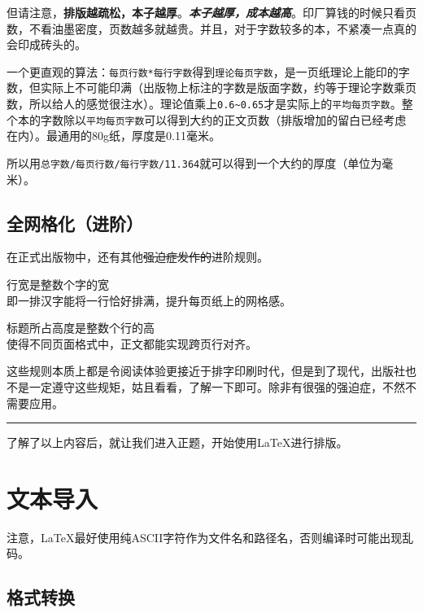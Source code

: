 \documentclass[10pt,openany]{book}
\begin{document}
但请注意，\textbf{排版越疏松，本子越厚}。\emph{\textbf{本子越厚，成本越高}}。印厂算钱的时候只看页数，不看油墨密度，页数越多就越贵。并且，对于字数较多的本，不紧凑一点真的会印成砖头的。

一个更直观的算法：\texttt{每页行数*每行字数}得到\texttt{理论每页字数}，是一页纸理论上能印的字数，但实际上不可能印满（出版物上标注的字数是版面字数，约等于理论字数乘页数，所以给人的感觉很注水）。理论值乘上\texttt{0.6\textasciitilde{}0.65}才是实际上的\texttt{平均每页字数}。整个本的字数除以\texttt{平均每页字数}可以得到大约的正文页数（排版增加的留白已经考虑在内）。最通用的80g纸，厚度是0.11毫米。

所以用\texttt{总字数/每页行数/每行字数/11.364}就可以得到一个大约的厚度（单位为毫米）。

\section{全网格化（进阶）}

在正式出版物中，还有其他\sout{强迫症发作的}进阶规则。

\begin{tightenum}
    \item   行宽是整数个字的宽\\即一排汉字能将一行恰好排满，提升每页纸上的网格感。
    \item   标题所占高度是整数个行的高\\使得不同页面格式中，正文都能实现跨页行对齐。
\end{tightenum}

这些规则本质上都是令阅读体验更接近于排字印刷时代，但是到了现代，出版社也不是一定遵守这些规矩，姑且看看，了解一下即可。除非有很强的强迫症，不然不需要应用。

\begin{center}\rule{0.5\linewidth}{0.5pt}\end{center}

了解了以上内容后，就让我们进入正题，开始使用{\LaTeX}进行排版。

\chapter{文本导入}

注意，{\LaTeX}最好使用纯ASCII字符作为文件名和路径名，否则编译时可能出现乱码。

\section{格式转换}
\end{document}
